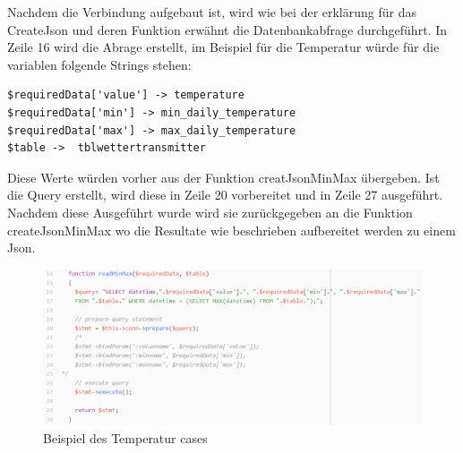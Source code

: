 Nachdem die Verbindung aufgebaut ist, wird wie bei der erklärung für das CreateJson und deren Funktion erwähnt die Datenbankabfrage durchgeführt. In Zeile 16 wird die Abrage erstellt, im Beispiel für die Temperatur würde für die variablen folgende Strings stehen:\\
\begin{lstlisting}
$requiredData['value'] -> temperature
$requiredData['min'] -> min_daily_temperature
$requiredData['max'] -> max_daily_temperature
$table ->  tblwettertransmitter
\end{lstlisting}
Diese Werte würden vorher aus der Funktion creatJsonMinMax übergeben. Ist die Query erstellt, wird diese in Zeile 20 vorbereitet und in Zeile 27 ausgeführt. Nachdem diese Ausgeführt wurde wird sie zurückgegeben an die Funktion createJsonMinMax wo die Resultate wie beschrieben aufbereitet werden zu einem Json.

\begin{figure}[h!]
	\centering
	\includegraphics[width=1\linewidth]{img/API_temperature_code_databaseQuery}
	\caption{Beispiel des Temperatur cases}
	\label{img:wetterstation}
\end{figure}
